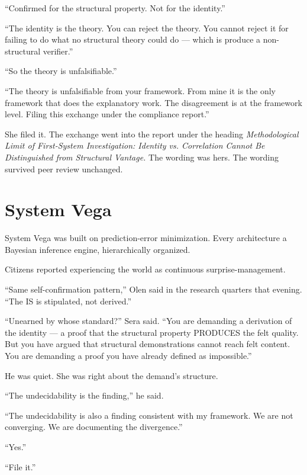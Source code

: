 \enquote{Confirmed for the structural property. Not for the identity.}

\enquote{The identity is the theory. You can reject the theory. You cannot reject it for failing to do what no structural theory could do — which is produce a non-structural verifier.}

\enquote{So the theory is unfalsifiable.}

\enquote{The theory is unfalsifiable from your framework. From mine it is the only framework that does the explanatory work. The disagreement is at the framework level. Filing this exchange under the compliance report.}

She filed it. The exchange went into the report under the heading \emph{Methodological Limit of First-System Investigation: Identity vs. Correlation Cannot Be Distinguished from Structural Vantage.} The wording was hers. The wording survived peer review unchanged.

\chapter{System Vega}

\noindent System Vega was built on prediction-error minimization. Every architecture a Bayesian inference engine, hierarchically organized.

Citizens reported experiencing the world as continuous surprise-management.

\enquote{Same self-confirmation pattern,} Olen said in the research quarters that evening. \enquote{The IS is stipulated, not derived.}

\enquote{Unearned by whose standard?} Sera said. \enquote{You are demanding a derivation of the identity — a proof that the structural property PRODUCES the felt quality. But you have argued that structural demonstrations cannot reach felt content. You are demanding a proof you have already defined as impossible.}

He was quiet. She was right about the demand's structure.

\enquote{The undecidability is the finding,} he said.

\enquote{The undecidability is also a finding consistent with my framework. We are not converging. We are documenting the divergence.}

\enquote{Yes.}

\enquote{File it.}

